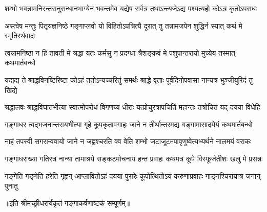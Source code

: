 

\twolineshloka
{शम्भो भवन्नामनिरन्तरानुसन्धानभाग्येन भवन्तमेव}
{यद्येष सर्वत्र तथाऽन्त्यजेऽद्य पश्यत्यहो कोऽत्र कृतोऽपराधः}%

\twolineshloka
{अस्त्वेष मन्तुः पितृयज्ञनिष्ठे गङ्गाप्लवो यो विहितोऽपचित्यै}
{दूरात् तु तन्नामजपेन शुद्धिर्न स्यात् कथं मे स्मृतिरर्थवादः}%

\twolineshloka
{त्वन्नामनिष्ठा न हि तावती मे श्रद्धा यतः कर्मसु न प्रदग्धा}
{त्रैशङ्कवं मे पशुपान्तरायो मुच्येय तस्मात् कथमार्तबन्धो}%

\twolineshloka
{यद्यद्य ते श्राद्धविनष्टिरिष्टा कोऽहं ततोऽन्यच्चरितुं समर्थः}
{श्राद्धे वृताः पूर्वदिनोपवासा नान्यत्र भुञ्जीयुरिदं तु खिद्ये}%

\twolineshloka
{श्रद्धालवः श्राद्धविघातभीत्या स्वात्मोपरोधं विगणय्य धीराः}
{यत्प्रोचुरत्रापचितिं महान्तः तत्रोचितं यद् दयया विधेहि}%

\twolineshloka
{गङ्गाधर त्वद्भजनान्तरायभीत्या गृहे कूपकृतावगाहः}
{जाने न तीर्थान्तरमद्य गङ्गामासादयेयं कथमार्तबन्धो}%

\twolineshloka
{नाहं तपस्वी सगरान्ववायो जाने न जह्वश्चरति क्व वेति}
{शम्भो जटाजूटमपावृणुष्वेत्यभ्यर्थने नालमयं वराकः}%

\twolineshloka
{गङ्गाधराख्या गतिरत्र नान्या तामाश्रये सङ्कटमोचनाय}
{हन्त प्रवाहः कथमत्र कूपे विस्फूर्जतीशः खलु मे प्रसन्नः}%

\twolineshloka
{गङ्गेति गङ्गेति हरेति गृह्णन् आप्लावितोऽहं दयया पुरारेः}
{कूपोत्थितोऽयं करुणाप्रवाहः गाङ्गश्चिरायात्र जनान् पुनातु}%


॥इति श्रीमच्छ्रीधरार्यकृतं गङ्गाकर्षणाष्टकं सम्पूर्णम्॥